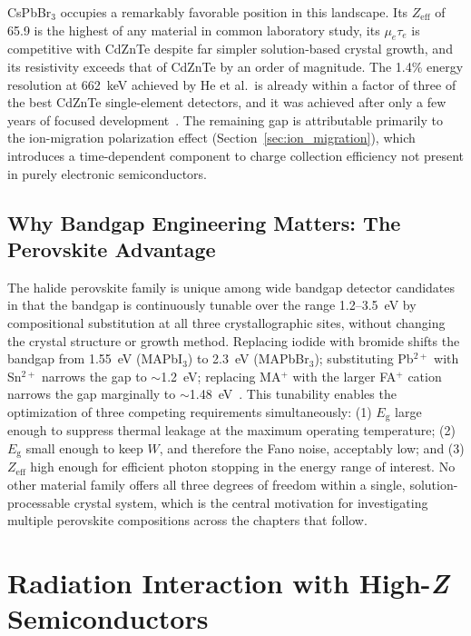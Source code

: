 CsPbBr$_3$ occupies a remarkably favorable position in this landscape.
Its $Z_{\mathrm{eff}}$ of 65.9 is the highest of any material in common
laboratory study, its $\mu_e\tau_e$ is competitive with CdZnTe despite
far simpler solution-based crystal growth, and its resistivity exceeds
that of CdZnTe by an order of magnitude.  The 1.4\% energy resolution
at 662~keV achieved by He et al.\ is already within a factor of three
of the best CdZnTe single-element detectors, and it was achieved after
only a few years of focused development~\cite{He_NatPhoton_2021}.  The
remaining gap is attributable primarily to the ion-migration polarization
effect (Section~\ref{sec:ion_migration}), which introduces a
time-dependent component to charge collection efficiency not present in
purely electronic semiconductors.

\subsection{Why Bandgap Engineering Matters: The Perovskite Advantage}

The halide perovskite family is unique among wide bandgap detector
candidates in that the bandgap is continuously tunable over the range
1.2--3.5~eV by compositional substitution at all three crystallographic
sites, without changing the crystal structure or growth method.  Replacing
iodide with bromide shifts the bandgap from 1.55~eV (MAPbI$_3$) to
2.3~eV (MAPbBr$_3$); substituting Pb$^{2+}$ with Sn$^{2+}$ narrows the
gap to $\sim$1.2~eV; replacing MA$^+$ with the larger FA$^+$ cation
narrows the gap marginally to $\sim$1.48~eV~\cite{Stoumpos2013}.
This tunability enables the optimization of three competing
requirements simultaneously: (1) $E_{\mathrm{g}}$ large enough to suppress
thermal leakage at the maximum operating temperature; (2) $E_{\mathrm{g}}$
small enough to keep $W$, and therefore the Fano noise, acceptably
low; and (3) $Z_{\mathrm{eff}}$ high enough for efficient photon stopping
in the energy range of interest.  No other material family offers all
three degrees of freedom within a single, solution-processable crystal
system, which is the central motivation for investigating multiple
perovskite compositions across the chapters that follow.

\section{Radiation Interaction with High-\textit{Z} Semiconductors}
\label{sec:radiation_interaction}


